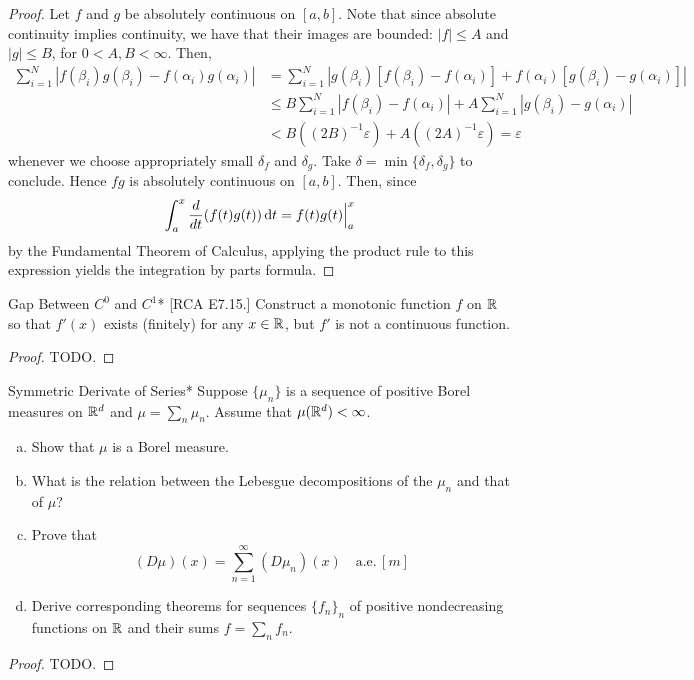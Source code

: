 \begin{proof}
    Let \(f\) and \(g\) be absolutely continuous on \([a, b]\). Note that since absolute continuity implies continuity, we have that their images are bounded: \(|f| \leq A\) and \(|g| \leq B\), for \(0 < A, B < \infty\). Then, 
    \begin{align*}
        \sum_{i=1}^N |f(\beta_i) g(\beta_i) - f(\alpha_i) g(\alpha_i)|
        &= \sum_{i=1}^N |g(\beta_i) [f(\beta_i) - f(\alpha_i)] + f(\alpha_i) [g(\beta_i) - g(\alpha_i)]| \\
        &\leq B \sum_{i=1}^N |f(\beta_i) - f(\alpha_i)| + A \sum_{i=1}^N |g(\beta_i) - g(\alpha_i)| \\
        &< B((2B)^{-1} \varepsilon) + A ((2A)^{-1} \varepsilon) 
        = \varepsilon
    \end{align*}
    whenever we choose appropriately small \(\delta_f\) and \(\delta_g\). Take \(\delta = \min\{\delta_f, \delta_g\}\) to conclude. Hence \(fg\) is absolutely continuous on \([a, b]\). Then, since
    \[
        \int_a^x \frac{d}{dt} (f(t) g(t)) \, \mathrm{d}t = f(t) g(t) \Big\rvert_a^x
    \]
    by the Fundamental Theorem of Calculus, applying the product rule to this expression yields the integration by parts formula. 
\end{proof}


\begin{problem}{Gap Between \(C^0\) and \(C^1\)}*
    [RCA E7.15.] Construct a monotonic function \(f\) on \(\mathbb{R}\) so that \(f'(x)\) exists (finitely) for any \(x \in \mathbb{R}\), but \(f'\) is not a continuous function. 
\end{problem}

\begin{proof}
    TODO. 
\end{proof}


\begin{problem}{Symmetric Derivate of Series}*
    Suppose \(\{\mu_n\}\) is a sequence of positive Borel measures on \(\mathbb{R}^d\) and \(\mu = \sum_n \mu_n\). Assume that \(\mu(\mathbb{R}^d) < \infty\). 
    \begin{enumerate}[(a)]
        \itemsep0em
        \item Show that \(\mu\) is a Borel measure.
        \item What is the relation between the Lebesgue decompositions of the \(\mu_n\) and that of \(\mu\)? 
        \item Prove that 
        \[
            (D\mu)(x) = \sum_{n=1}^\infty (D\mu_n)(x)
            \quad \text{a.e.}\, [m]
        \]
        \item Derive corresponding theorems for sequences \(\{f_n\}_n\) of positive nondecreasing functions on \(\mathbb{R}\) and their sums \(f = \sum_n f_n\). 
    \end{enumerate}
\end{problem}

\begin{proof}
    TODO. 
\end{proof}



